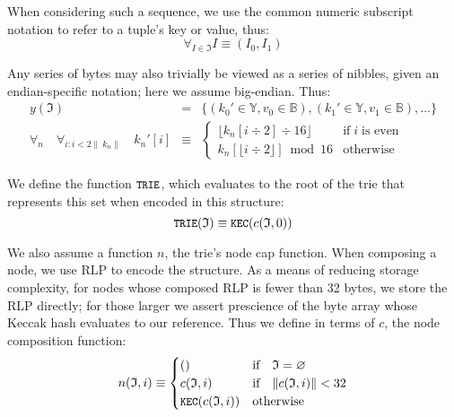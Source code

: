 \documentclass[9pt,oneside]{amsart}
\begin{document}
When considering such a sequence, we use the common numeric subscript notation to refer to a tuple's key or value, thus:
\begin{equation}
\forall_{I \in \mathfrak{I}} I \equiv (I_0, I_1)
\end{equation}

Any series of bytes may also trivially be viewed as a series of nibbles, given an endian-specific notation; here we assume big-endian. Thus:
\begin{eqnarray}
y(\mathfrak{I}) & = & \{ (k_0' \in \mathbb{Y}, v_0 \in \mathbb{B}), (k_1' \in \mathbb{Y}, v_1 \in \mathbb{B}), ... \} \\
\forall_n \quad \forall_{i: i < 2\lVert\ k_n\rVert} \quad k_n'[i] & \equiv &
\begin{cases}
\lfloor k_n[i \div 2] \div 16 \rfloor & \text{if} \; i \; \text{is even} \\
k_n[\lfloor i \div 2 \rfloor] \bmod 16 & \text{otherwise}
\end{cases}
\end{eqnarray}

We define the function $\texttt{\small TRIE}$, which evaluates to the root of the trie that represents this set when encoded in this structure:
\begin{equation}
\texttt{\small TRIE}(\mathfrak{I}) \equiv \texttt{\small KEC}(c(\mathfrak{I}, 0))
\end{equation}

We also assume a function $n$, the trie's node cap function. When composing a node, we use RLP to encode the structure. As a means of reducing storage complexity, for nodes whose composed RLP is fewer than 32 bytes, we store the RLP directly; for those larger we assert prescience of the byte array whose Keccak hash evaluates to our reference. Thus we define in terms of $c$, the node composition function:
\begin{equation}
n(\mathfrak{I}, i) \equiv \begin{cases}
() & \text{if} \quad \mathfrak{I} = \varnothing \\
c(\mathfrak{I}, i) & \text{if} \quad \lVert c(\mathfrak{I}, i)\rVert < 32 \\
\texttt{\small KEC}(c(\mathfrak{I}, i)) & \text{otherwise}
\end{cases}
\end{equation}
\end{document}
